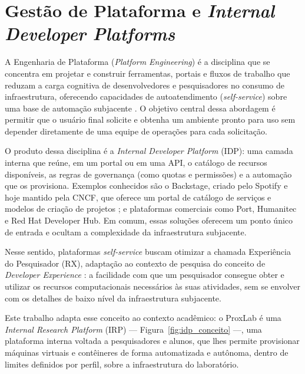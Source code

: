 
\section{Gestão de Plataforma e \textit{Internal Developer Platforms}}
\label{sec:idp}

\par A Engenharia de Plataforma (\textit{Platform Engineering}) é a disciplina que se concentra em projetar e construir ferramentas, portais e fluxos de trabalho que reduzam a carga cognitiva de desenvolvedores e pesquisadores no consumo de infraestrutura, oferecendo capacidades de autoatendimento (\textit{self-service}) sobre uma base de automação subjacente \cite{cncfPlatforms:online,Anjum2026}. O objetivo central dessa abordagem é permitir que o usuário final solicite e obtenha um ambiente pronto para uso sem depender diretamente de uma equipe de operações para cada solicitação.\\
\par O produto dessa disciplina é a \textit{Internal Developer Platform} (IDP): uma camada interna que reúne, em um portal ou em uma API, o catálogo de recursos disponíveis, as regras de governança (como quotas e permissões) e a automação que os provisiona. Exemplos conhecidos são o Backstage, criado pelo Spotify e hoje mantido pela CNCF, que oferece um portal de catálogo de serviços e modelos de criação de projetos \cite{backstageDocs:online}; e plataformas comerciais como Port, Humanitec e Red Hat Developer Hub. Em comum, essas soluções oferecem um ponto único de entrada e ocultam a complexidade da infraestrutura subjacente.\\
\par Nesse sentido, plataformas \textit{self-service} buscam otimizar a chamada Experiência do Pesquisador (RX), adaptação ao contexto de pesquisa do conceito de \textit{Developer Experience} \cite{Fagerholm2012,Greiler2023}: a facilidade com que um pesquisador consegue obter e utilizar os recursos computacionais necessários às suas atividades, sem se envolver com os detalhes de baixo nível da infraestrutura subjacente.\\
\par Este trabalho adapta esse conceito ao contexto acadêmico: o ProxLab é uma \textit{Internal Research Platform} (IRP) --- Figura~\ref{fig:idp_conceito} ---, uma plataforma interna voltada a pesquisadores e alunos, que lhes permite provisionar máquinas virtuais e contêineres de forma automatizada e autônoma, dentro de limites definidos por perfil, sobre a infraestrutura do laboratório.

